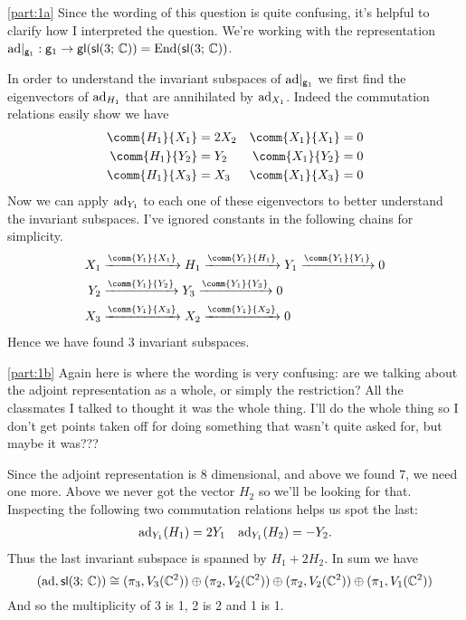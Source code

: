 \documentclass[
	pages,
	boxes,
	color=WildStrawberry
]{homework}
\begin{document}
\begin{solution}
	\ref{part:1a}
	Since the wording of this question is quite confusing, it's helpful to clarify how I interpreted the question. We're working with the representation $\operatorname{ad}\!|_{\mathsf{g}_1}:\mathsf{g}_1\to\mathsf{gl}(\mathsf{sl}(3;\, \mathbb{C})) = \operatorname{End}(\mathsf{sl}(3;\, \mathbb{C}))$.

	In order to understand the invariant subspaces of $\operatorname{ad}\!|_{\mathsf{g}_1}$ we first find the eigenvectors of $\operatorname{ad}_{H_1}$ that are annihilated by $\operatorname{ad}_{X_1}$. Indeed the commutation relations easily show we have
	\begin{align*}
		\comm{H_1}{X_1} & = 2X_2 & \comm{X_1}{X_1} & = 0 \\
		\comm{H_1}{Y_2} & = Y_2  & \comm{X_1}{Y_2} & = 0 \\
		\comm{H_1}{X_3} & = X_3  & \comm{X_1}{X_3} & = 0
	\end{align*}
	Now we can apply $\operatorname{ad}_{Y_1}$ to each one of these eigenvectors to better understand the invariant subspaces. I've ignored constants in the following chains for simplicity.
	\begin{align*}
		X_1 & \xrightarrow{\comm{Y_1}{X_1}} H_1 \xrightarrow{\comm{Y_1}{H_1}}Y_1 \xrightarrow{\comm{Y_1}{Y_1}} 0 \\
		Y_2 & \xrightarrow{\comm{Y_1}{Y_2}} Y_3 \xrightarrow{\comm{Y_1}{Y_3}} 0                                  \\
		X_3 & \xrightarrow{\comm{Y_1}{X_3}} X_2 \xrightarrow{\comm{Y_1}{X_2}} 0                                  \\
	\end{align*}
	Hence we have found 3 invariant subspaces.

	\ref{part:1b}
	Again here is where the wording is very confusing: are we talking about the adjoint representation as a whole, or simply the restriction? All the classmates I talked to thought it was the whole thing. I'll do the whole thing so I don't get points taken off for doing something that wasn't quite asked for, but maybe it was???

	Since the adjoint representation is 8 dimensional, and above we found 7, we need one more. Above we never got the vector $H_2$ so we'll be looking for that. Inspecting the following two commutation relations helps us spot the last:
	\begin{align*}
		\operatorname{ad}_{Y_1}(H_1) = 2Y_1 &  & \operatorname{ad}_{Y_1}(H_2) = -Y_2.
	\end{align*}
	Thus the last invariant subspace is spanned by $H_1 + 2H_2$. In sum we have
	\begin{equation*}
		(\operatorname{ad}, \mathsf{sl}(3;\, \mathbb{C}))\cong (\pi_3, V_3(\mathbb{C}^2))\oplus (\pi_2, V_2(\mathbb{C}^2)) \oplus (\pi_2, V_2(\mathbb{C}^2)) \oplus (\pi_1, V_1(\mathbb{C}^2))
	\end{equation*}
	And so the multiplicity of 3 is 1, 2 is 2 and 1 is 1.
\end{solution}
\end{document}
